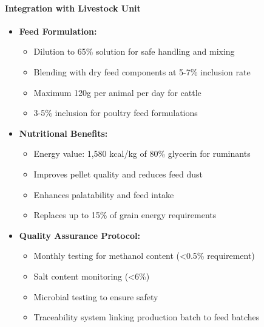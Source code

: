 \paragraph{Integration with Livestock Unit}
\label{sec:glycerin_feed_supplement}
\begin{itemize}
    \item \textbf{Feed Formulation:}
    \begin{itemize}
        \item Dilution to 65\% solution for safe handling and mixing
        \item Blending with dry feed components at 5-7\% inclusion rate
        \item Maximum 120g per animal per day for cattle
        \item 3-5\% inclusion for poultry feed formulations
    \end{itemize}
    
    \item \textbf{Nutritional Benefits:}
    \begin{itemize}
        \item Energy value: 1,580 kcal/kg of 80\% glycerin for ruminants
        \item Improves pellet quality and reduces feed dust
        \item Enhances palatability and feed intake
        \item Replaces up to 15\% of grain energy requirements
    \end{itemize}
    
    \item \textbf{Quality Assurance Protocol:}
    \begin{itemize}
        \item Monthly testing for methanol content (<0.5\% requirement)
        \item Salt content monitoring (<6\%)
        \item Microbial testing to ensure safety
        \item Traceability system linking production batch to feed batches
    \end{itemize}
\end{itemize}

